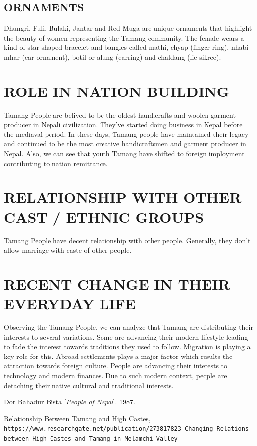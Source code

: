 \documentclass[a4paper,14pt]{article}
\begin{document}
\begin{flushleft}
	\newpage
	\subsection{ORNAMENTS}
	Dhungri, Fuli, Bulaki, Jantar and Red Muga are unique ornaments that highlight the beauty of women representing the Tamang community. 
	The female wears a kind of star shaped bracelet and bangles called mathi, chyap (finger ring), nhabi mhar (ear ornament), botil or alung (earring) and chaldang (lie sikree).

	\newpage
	\section{ROLE IN NATION BUILDING}
	Tamang People are belived to be the oldest handicrafts and woolen garment producer in Nepali civilization. They've started doing business in Nepal before  the mediaval period. In these days, Tamang people have maintained their legacy and continued to be the most creative handicraftsmen and garment producer in Nepal. Also, we can see that youth Tamang have shifted to foreign imployment contributing to nation remittance. 
	
	\newpage
	\section{RELATIONSHIP WITH OTHER CAST / ETHNIC GROUPS}
	Tamang People have decent relationship with other people. Generally, they don't allow marriage with caste of other people.
	

	\newpage
	\section{RECENT CHANGE IN THEIR EVERYDAY LIFE}
	Observing the Tamang People, we can analyze that Tamang are distributing their interests to several variations. Some are advancing their modern lifestyle leading to fade the interest towards traditions they used to follow. Migration is playing a key role for this. Abroad settlements plays a major factor which results the attraction towards foreign culture. People are advancing their interests to technology and modern finances. Due to such modern context, people are detaching their native cultural and traditional interests.



	\newpage

	\begin{thebibliography}{9}

		Dor Bahadur Bista
			[\textit{People of Nepal}].
		1987.

		
		Relationship Between Tamang and High Castes,
		\\\texttt{https://www.researchgate.net/publication/273817823_Changing_Relations_between_High_Castes_and_Tamang_in_Melamchi_Valley}

	\end{thebibliography}

\end{flushleft}
\end{document}
